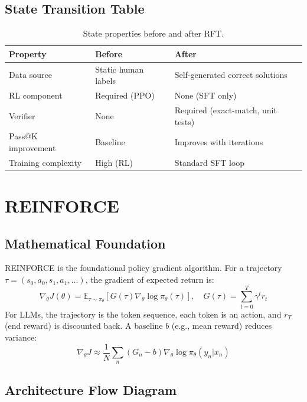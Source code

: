 \documentclass{article}
\begin{document}
\subsection{State Transition Table}
\begin{table}[h]\centering
\begin{tabular}{lll}\toprule
\textbf{Property} & \textbf{Before} & \textbf{After}\\\midrule
Data source & Static human labels & Self-generated correct solutions\\
RL component & Required (PPO) & None (SFT only)\\
Verifier & None & Required (exact-match, unit tests)\\
Pass@K improvement & Baseline & Improves with iterations\\
Training complexity & High (RL) & Standard SFT loop\\\bottomrule
\end{tabular}
\caption{State properties before and after RFT.}
\end{table}

\newpage
\section{REINFORCE}

\subsection{Mathematical Foundation}
REINFORCE is the foundational policy gradient algorithm. For a trajectory $\tau = (s_0,a_0,s_1,a_1,\ldots)$, the gradient of expected return is:
\begin{equation}
  \nabla_\theta J(\theta) = \mathbb{E}_{\tau \sim \pi_\theta}\!\left[G(\tau) \nabla_\theta \log \pi_\theta(\tau)\right],\quad G(\tau) = \sum_{t=0}^T \gamma^t r_t
\end{equation}
For LLMs, the trajectory is the token sequence, each token is an action, and $r_T$ (end reward) is discounted back. A baseline $b$ (e.g., mean reward) reduces variance:
\begin{equation}
  \nabla_\theta J \approx \frac{1}{N}\sum_n (G_n - b)\nabla_\theta \log \pi_\theta(y_n|x_n)
\end{equation}

\subsection{Architecture Flow Diagram}
\end{document}
